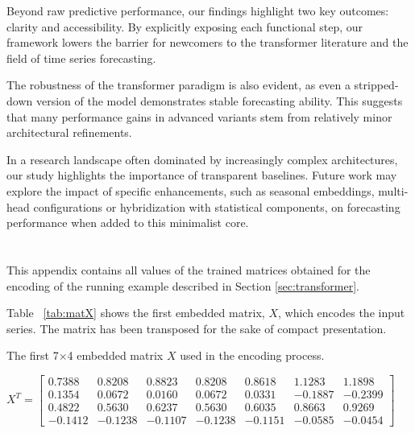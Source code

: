 \documentclass[algorithms,article,submit,pdftex,moreauthors]{Definitions/mdpi}
\begin{document}
Beyond raw predictive performance, our findings highlight two key outcomes: clarity and accessibility. By explicitly exposing each functional step, our framework lowers the barrier for newcomers to the transformer literature and the field of time series forecasting.

The robustness of the transformer paradigm is also evident, as even a stripped-down version of the model demonstrates stable forecasting ability. This suggests that many performance gains in advanced variants stem from relatively minor architectural refinements.

In a research landscape often dominated by increasingly complex architectures, our study highlights the importance of transparent baselines. Future work may explore the impact of specific enhancements, such as seasonal embeddings, multi-head configurations or hybridization with statistical components, on forecasting performance when added to this minimalist core.

\appendixstart
\appendix
\section[\appendixname~\thesection]{} \label{sec:appendix}
This appendix contains all values of the trained matrices obtained for the encoding of the running example described in Section \ref{sec:transformer}.

\noindent Table ~\ref{tab:matX} shows the first embedded matrix, $X$, which encodes the input series. The matrix has been transposed for the sake of compact presentation.

\begin{table}[ht]
	\centering
	\caption{The first 7$\times$4 embedded matrix $X$ used in the encoding process.}
	\label{tab:matX}
	$
	X^T =	\begin{bmatrix}
			0.7388 & 0.8208 & 0.8823 & 0.8208 & 0.8618 & 1.1283 & 1.1898 \\
			0.1354 & 0.0672 & 0.0160 & 0.0672 & 0.0331 & -0.1887 & -0.2399 \\
			0.4822 & 0.5630 & 0.6237 & 0.5630 & 0.6035 & 0.8663 & 0.9269 \\
			-0.1412 & -0.1238 & -0.1107 & -0.1238 & -0.1151 & -0.0585 & -0.0454
		\end{bmatrix}
	$
\end{table}
\end{document}
